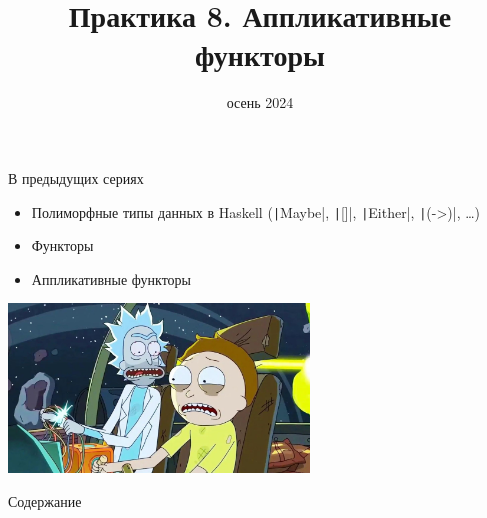 
\newif\ifhandout




\title[8. Аппликативные функторы]{Практика 8. Аппликативные функторы}
\date{осень 2024}



    \setcounter{framenumber}{-1}
    \maketitle

    \begin{frame}[fragile]{В предыдущих сериях}
        \begin{itemize}
            \item Полиморфные типы данных в Haskell (\texttt|Maybe|, \texttt|[]|, \texttt|Either|, \texttt|(->)|, \ldots)
            \item Функторы
            \item[\newtopic] Аппликативные функторы
        \end{itemize}
        \begin{center}
            \includegraphics[width=0.6\textwidth]{figs/previous}
        \end{center}
    \end{frame}

    \begin{frame}[noframenumbering]{Содержание}
        \tableofcontents
    \end{frame}


